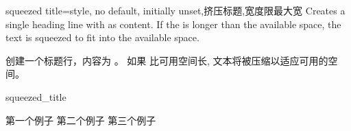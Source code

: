 \begin{docTcbKey}[][doc new=2014-11-24]{squeezed title}{=}{style, no default, initially unset,挤压标题,宽度限最大宽}
Creates a single heading line with  as content.
If the  is longer than the available space, the text is
squeezed to fit into the available space.

创建一个标题行，内容为 。%
如果  比可用空间长, 文本将被压缩以适应可用的空间。
\begin{exdispExample}{squeezed_title}
\begin{tcbitemize}[
raster columns=3,%
raster equal height,%
colframe=red!75!black,colback=red!5!white,%
fonttitle=\bfseries%
]
\tcbitem[squeezed title={短标题}]
第一个例子
\tcbitem[squeezed title={这是一个非常非常长的标题}]
第二个例子
\tcbitem[squeezed title={这个标题显然对这个例子来说太长了}]
第三个例子
\end{tcbitemize}
\end{exdispExample}
\end{docTcbKey}










